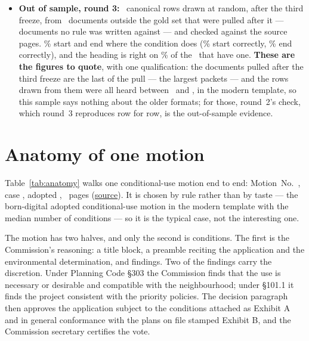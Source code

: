 \documentclass[11pt]{article}
\newcommand{\cctable}[1]{\FloatBarrier\def\cctab{#1}}
\begin{document}
\begin{itemize}
matched rows that carry one, and in the \ccValNoneDocs\ gold documents with no conditions the
parser found \ccValNoneFalse. \textbf{These are in-sample figures}: the gold documents belong to
the pool the rules were written against. Of the \ccValCarryRows\ rows round~2 was checked on
out of sample, round~3 reproduces \ccValCarryReproduced\ exactly, \ccValCarryCorrect\ of them
correct: round~2's out-of-sample figure stands for round~3 on those rows.
\item \textbf{Out of sample, round 3:} \ccValOutRows\ canonical rows drawn at random, after the
third freeze, from \ccValOutDocs\ documents outside the gold set that were pulled after it ---
documents no rule was written against --- and checked against the source pages. \ccValOutPrec\%
start and end where the condition does (\ccValOutStart\% start correctly, \ccValOutEnd\% end
correctly), and the heading is right on \ccValOutHead\% of the \ccValOutHeadN\ that have one.
\textbf{These are the figures to quote}, with one qualification: the documents pulled after the
third freeze are the last of the pull --- the largest packets --- and the rows drawn from them
were all heard between \ccValOutYearFrom\ and \ccValOutYearTo, in the modern template, so this
sample says nothing about the older formats; for those, round~2's check, which round~3
reproduces row for row, is the out-of-sample evidence.
\end{itemize}

\cctable{roundeffect}

\section{Anatomy of one motion}
\label{sec:anatomy}

Table~\ref{tab:anatomy} walks one conditional-use motion end to end:
Motion~No.~\ccAnatMotion, case \texttt{\ccAnatCase}, adopted \ccAnatAdopted, \ccAnatPages\
pages (\href{\ccAnatUrl}{source}). It is chosen by rule rather than by taste --- the
born-digital adopted conditional-use motion in the modern template with the median number of
conditions --- so it is the typical case, not the interesting one.

The motion has two halves, and only the second is conditions. The first is the Commission's
reasoning: a title block, a preamble reciting the application and the environmental
determination, and findings. Two of the findings carry the discretion. Under Planning Code
\S303 the Commission finds that the use is necessary or desirable and compatible with the
neighbourhood; under \S101.1 it finds the project consistent with the priority policies.
The decision paragraph then approves the application subject to the conditions attached as
Exhibit A and in general conformance with the plans on file stamped Exhibit B, and the
Commission secretary certifies the vote.
\end{document}
